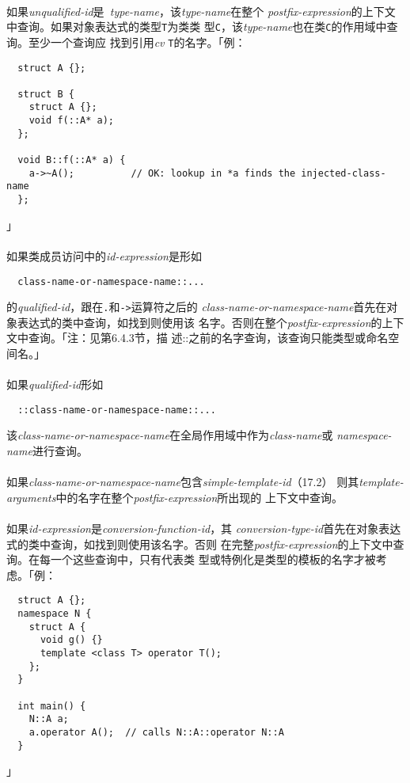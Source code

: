 \paragraph{}
如果\textit{unqualified-id}是\textit{~type-name}，该\textit{type-name}在整个
\textit{postfix-expression}的上下文中查询。如果对象表达式的类型\texttt{T}为类类
型\texttt{C}，该\textit{type-name}也在类\texttt{C}的作用域中查询。至少一个查询应
找到引用\textit{cv} \texttt{T}的名字。「例：
\begin{lstlisting}
  struct A {};

  struct B {
    struct A {};
    void f(::A* a);
  };

  void B::f(::A* a) {
    a->~A();          // OK: lookup in *a finds the injected-class-name
  };
\end{lstlisting}」

\paragraph{}
如果类成员访问中的\textit{id-expression}是形如
\begin{lstlisting}
  class-name-or-namespace-name::...
\end{lstlisting}
的\textit{qualified-id}，跟在\texttt{.}和\texttt{->}运算符之后的
\textit{class-name-or-namespace-name}首先在对象表达式的类中查询，如找到则使用该
名字。否则在整个\textit{postfix-expression}的上下文中查询。「注：见第6.4.3节，描
述::之前的名字查询，该查询只能类型或命名空间名。」

\paragraph{}
如果\textit{qualified-id}形如
\begin{lstlisting}
  ::class-name-or-namespace-name::...
\end{lstlisting}
该\textit{class-name-or-namespace-name}在全局作用域中作为\textit{class-name}或
\textit{namespace-name}进行查询。

\paragraph{}
如果\textit{class-name-or-namespace-name}包含\textit{simple-template-id}（17.2）
则其\textit{template-arguments}中的名字在整个\textit{postfix-expression}所出现的
上下文中查询。

\paragraph{}
如果\textit{id-expression}是\textit{conversion-function-id}，其
\textit{conversion-type-id}首先在对象表达式的类中查询，如找到则使用该名字。否则
在完整\textit{postfix-expression}的上下文中查询。在每一个这些查询中，只有代表类
型或特例化是类型的模板的名字才被考虑。「例：
\begin{lstlisting}
  struct A {};
  namespace N {
    struct A {
      void g() {}
      template <class T> operator T();
    };
  }

  int main() {
    N::A a;
    a.operator A();  // calls N::A::operator N::A
  }
\end{lstlisting}」

